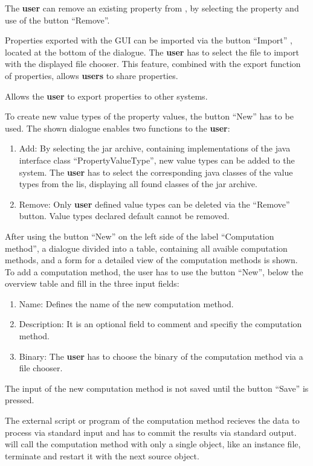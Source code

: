 The \textbf{user} can remove an existing property from \edacc, by  selecting the property and use of the button ``Remove''.

Properties exported with the GUI can be imported via the button ``Import'' , located at the bottom of the dialogue. The \textbf{user} has to select the file to import with the displayed file chooser. This feature, combined with the export function of properties, allows \textbf{users} to share properties.

Allows the \textbf{user} to export properties to other \edacc systems.

\label{definePropertyValuetype}
To create new value types of the property values, the button ``New'' has to be used. The shown dialogue enables two functions to the \textbf{user}:
\begin{enumerate}
	\item Add: By selecting the jar archive, containing implementations of the java interface class ``PropertyValueType'', new value types can be added to the \edacc system. The \textbf{user} has to select the corresponding java classes of the value types from the lis, displaying all found classes of the jar archive.
	\item Remove: Only \textbf{user} defined value types can be deleted via the ``Remove'' button. Value types declared default cannot be removed.
\end{enumerate}

After using the button ``New'' on the left side of the label ``Computation method'', a dialogue divided into a table, containing all avaible computation methods, and a form for a detailed view of the computation methods is shown. To add a computation method, the user has to use the button ``New'', below the overview table and fill in the three input fields:
\begin{enumerate}
	\item Name: Defines the name of the new computation method.
	\item Description: It is an optional field to comment and specifiy the computation method.
	\item Binary: The \textbf{user} has to choose the binary of the computation method via a file chooser.
\end{enumerate}
\attention The input of the new computation method is not saved until the button ``Save'' is pressed. 

\attention The external script or program of the computation method recieves the data to process via standard input  and has to commit the results via standard output. \edacc will call the computation method with only a single object, like an instance file, terminate and restart it with the next source object.